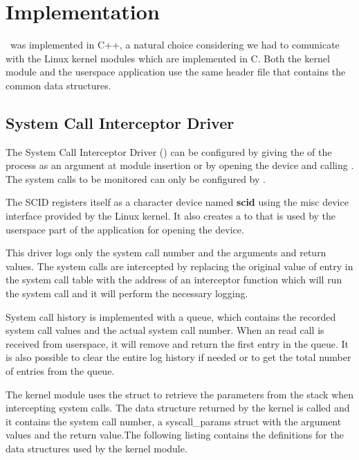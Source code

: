 \chapter{Implementation}
\label{chapter:fourth-chapter}

\project\ was implemented in C++, a natural choice considering we had to comunicate with the Linux kernel modules which are implemented in C. Both the kernel module and the userspace application use the same header file that contains the common data structures.

\section{System Call Interceptor Driver}
\label{fourth:scid}

The System Call Interceptor Driver () can be configured by giving the  of the process as an argument at module insertion or by opening the device and calling . The system calls to be monitored can only be configured by .

The SCID registers itself as a character device named \textbf{scid} using the misc device interface provided by the Linux kernel. It also creates a  to  that is used by the userspace part of the application for opening the device.

This driver logs only the system call number and the arguments and return values. The system calls are intercepted by replacing the original value of entry in the system call table with the address of an interceptor function which will run the system call and it will perform the necessary logging.

System call history is implemented with a queue, which contains the recorded system call values and the actual system call number. When an  read call is received from userspace, it will remove and return the first entry in the queue. It is also possible to clear the entire log history if needed or to get the total number of entries from the queue.

The kernel module uses the  struct to retrieve the parameters from the stack when intercepting system calls. The data structure returned by the kernel is called  and it contains the system call number, a syscall_params struct with the argument values and the return value.The following listing contains the definitions for the data structures used by the kernel module.

